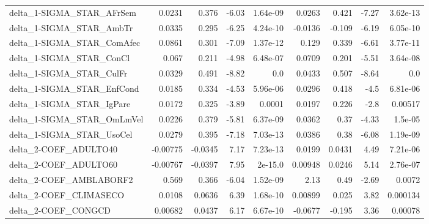 \begin{tabular}{lrrrrrrrr}
delta\_1-SIGMA\_STAR\_AFrSem             &      0.0231 &        0.376 &    -6.03 & 1.64e-09 &     0.0263 &       0.421 &        -7.27 &      3.62e-13 \\
delta\_1-SIGMA\_STAR\_AmbTr              &      0.0335 &        0.295 &    -6.25 & 4.24e-10 &    -0.0136 &      -0.109 &        -6.19 &      6.05e-10 \\
delta\_1-SIGMA\_STAR\_ComAfec            &      0.0861 &        0.301 &    -7.09 & 1.37e-12 &      0.129 &       0.339 &        -6.61 &      3.77e-11 \\
delta\_1-SIGMA\_STAR\_ConCl              &       0.067 &        0.211 &    -4.98 & 6.48e-07 &     0.0709 &       0.201 &        -5.51 &      3.64e-08 \\
delta\_1-SIGMA\_STAR\_CulFr              &      0.0329 &        0.491 &    -8.82 &      0.0 &     0.0433 &       0.507 &        -8.64 &           0.0 \\
delta\_1-SIGMA\_STAR\_EnfCond            &      0.0185 &        0.334 &    -4.53 & 5.96e-06 &     0.0296 &       0.418 &         -4.5 &      6.81e-06 \\
delta\_1-SIGMA\_STAR\_IgPare             &      0.0172 &        0.325 &    -3.89 &   0.0001 &     0.0197 &       0.226 &         -2.8 &       0.00517 \\
delta\_1-SIGMA\_STAR\_OmLmVel            &      0.0226 &        0.379 &    -5.81 & 6.37e-09 &     0.0362 &        0.37 &        -4.33 &       1.5e-05 \\
delta\_1-SIGMA\_STAR\_UsoCel             &      0.0279 &        0.395 &    -7.18 & 7.03e-13 &     0.0386 &        0.38 &        -6.08 &      1.19e-09 \\
delta\_2-COEF\_ADULTO40                 &    -0.00775 &      -0.0345 &     7.17 & 7.23e-13 &     0.0199 &      0.0431 &         4.49 &      7.21e-06 \\
delta\_2-COEF\_ADULTO60                 &    -0.00767 &      -0.0397 &     7.95 &  2e-15.0 &    0.00948 &      0.0246 &         5.14 &      2.76e-07 \\
delta\_2-COEF\_AMBLABORF2               &       0.569 &        0.366 &    -6.04 & 1.52e-09 &       2.13 &        0.49 &        -2.69 &        0.0072 \\
delta\_2-COEF\_CLIMASECO                &      0.0108 &       0.0636 &     6.39 & 1.68e-10 &    0.00899 &       0.025 &         3.82 &      0.000134 \\
delta\_2-COEF\_CONGCD                   &     0.00682 &       0.0437 &     6.17 & 6.67e-10 &    -0.0677 &      -0.195 &         3.36 &       0.00078 \\

\end{tabular}
